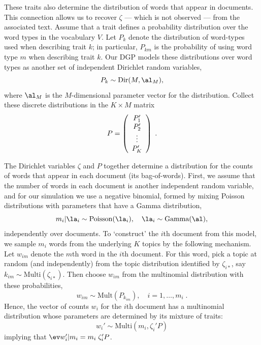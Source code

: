 \documentclass[10pt]{article}
\begin{document}
These traits also determine the distribution of words that appear in documents.  This connection allows us to recover $\zeta$ --- which is not observed --- from the associated text.  Assume that a trait defines a probability distribution over the word types in the vocabulary $V$.  Let $P_k$ denote the distribution of word-types used when describing trait $k$; in particular, $P_{km}$ is the probability of using word type $m$ when describing trait $k$.  Our DGP models these distributions over word types as another set of independent Dirichlet random variables,
 \begin{equation}
   P_k \sim \mbox{Dir}(M, \al_M),
   \label{eq:Pk}
 \end{equation}
where $\al_M$ is the $M$-dimensional parameter vector for the distribution.
 Collect these discrete
 distributions in the $K \times M$ matrix
 \begin{equation}
    P = \left(  \begin{array}{c} 
                    P_1' \cr P_2' \cr  \vdots \cr P_K'
                \end{array}
        \right) \;.
 \label{eq:P}
 \end{equation}
 
 
The Dirichlet variables $\zeta$ and $P$ together determine a distribution for the counts of words that appear in each document (its bag-of-words).  First, we assume that the number of words in each document is another independent random variable, and for our simulation we use a negative binomial, formed by mixing Poisson distributions with parameters that have a Gamma distribution,
\begin{equation}
  m_i|\la_i \sim \mbox{Poisson}(\la_i), \quad \la_i \sim \mbox{Gamma}(\al),
\end{equation}
independently over documents.  To `construct' the $i$th document from this model, we sample $m_i$ words from the underlying $K$ topics by the following mechanism.  Let $w_{im}$ denote the $m$th word in the $i$th document.  For this word, pick a topic at random (and independently) from the topic distribution identified by $\zeta_{i*}$, say $k_{im} \sim \mbox{Multi}(\zeta_{i*})$.  Then choose $w_{im}$ from the multinomial distribution with these probabilities, 
\begin{equation}
  w_{im} \sim \mbox{Mult}(P_{k_{im}}), \quad i = 1,\ldots,m_i \;.
  \label{eq:wim}
\end{equation}
Hence, the vector of counts $w_i$ for the $i$th document has a multinomial distribution whose parameters are determined by its mixture of traits:
 \begin{equation}
   w_i' \sim \mbox{Multi}(m_i, \zeta_i' P)   
 \label{eq:di}
 \end{equation}
 implying that $\ev w_i' | m_i = m_i \; \zeta_i'P$.  
 
\end{document}
